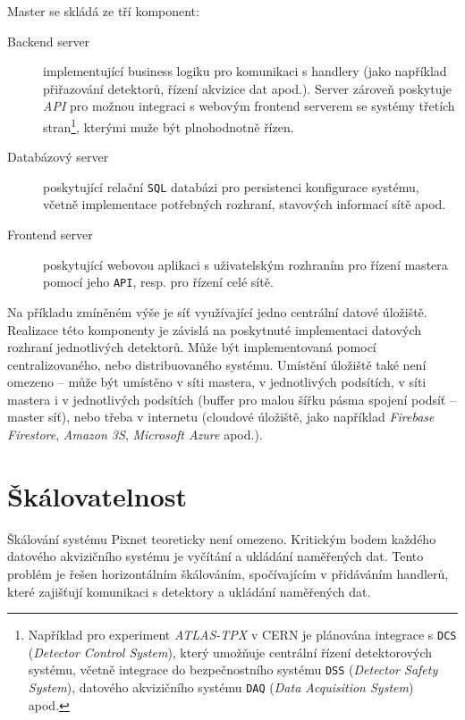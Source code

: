 Master se skládá ze tří komponent:
\begin{description}
    \item[Backend server] implementující business logiku pro komunikaci s handlery (jako například přiřazování detektorů, řízení akvizice dat apod.). Server zároveň poskytuje \textit{API} pro možnou integraci s webovým frontend serverem se systémy třetích stran\footnote{Například pro experiment \textit{ATLAS-TPX} v CERN je plánována integrace s \texttt{DCS} \cite{cern_dcs} (\textit{Detector Control System}), který umožňuje centrální řízení detektorových systému, včetně integrace do bezpečnostního systému \texttt{DSS} (\textit{Detector Safety System}), datového akvizičního systému \texttt{DAQ} (\textit{Data Acquisition System}) apod.}, kterými muže být plnohodnotně řízen.
    \item[Databázový server] poskytující relační \texttt{SQL} databázi pro persistenci konfigurace systému, včetně implementace potřebných rozhraní, stavových informací sítě apod.
    \item[Frontend server] poskytující webovou aplikaci s uživatelským rozhraním pro řízení mastera pomocí jeho \texttt{API}, resp. pro řízení celé sítě.
\end{description}

Na příkladu zmíněném výše je síť využívající jedno centrální datové úložiště. Realizace této komponenty je závislá na poskytnuté implementaci datových rozhraní jednotlivých detektorů. Může být implementovaná pomocí centralizovaného, nebo distribuovaného systému. Umístění úložiště také není omezeno -- může být umístěno v síti mastera, v jednotlivých podsítích, v síti mastera i v jednotlivých podsítích (buffer pro malou šířku pásma spojení podsíť -- master síť), nebo třeba v internetu (cloudové úložiště, jako například \textit{Firebase Firestore}, \textit{Amazon 3S}, \textit{Microsoft Azure} apod.).

\section{Škálovatelnost}
Škálování systému Pixnet teoreticky není omezeno. Kritickým bodem každého datového akvizičního systému je vyčítání a ukládání naměřených dat. Tento problém je řešen horizontálním škálováním, spočívajícím v přidáváním handlerů, které zajišťují komunikaci s detektory a ukládání naměřených dat.


